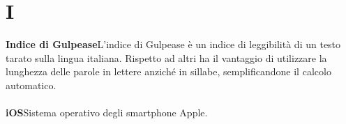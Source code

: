 \newpage
\section{I}\label{l:I}
\textbf{Indice di Gulpease}\newline L'indice di Gulpease è un indice di leggibilità di un testo tarato sulla lingua italiana. Rispetto ad altri ha il vantaggio di utilizzare la lunghezza delle parole in lettere anziché in sillabe, semplificandone il calcolo automatico.\\\\
\textbf{iOS}\newline Sistema operativo degli smartphone Apple.